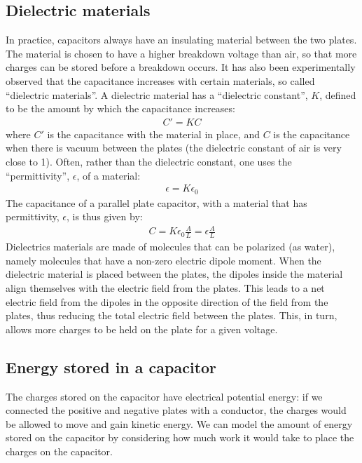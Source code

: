 \subsection{Dielectric materials}
In practice, capacitors always have an insulating material between the two plates. The material is chosen to have a higher breakdown voltage than air, so that more charges can be stored before a breakdown occurs. It has also been experimentally observed that the capacitance increases with certain materials, so called ``dielectric materials''. A dielectric material has a ``dielectric constant'', $K$, defined to be the amount by which the capacitance increases:
\begin{align*}
C'=KC
\end{align*}
where $C'$ is the capacitance with the material in place, and $C$ is the capacitance when there is vacuum between the plates (the dielectric constant of air is very close to 1). Often, rather than the dielectric constant, one uses the ``permittivity'', $\epsilon$, of a material:
\begin{align*}
\epsilon=K\epsilon_0
\end{align*}
The capacitance of a parallel plate capacitor, with a material that has permittivity, $\epsilon$, is thus given by:
\begin{align*}
C=K\epsilon_0\frac{A}{L}=\epsilon\frac{A}{L}
\end{align*}
Dielectrics materials are made of molecules that can be polarized (as water), namely molecules that have a non-zero electric dipole moment. When the dielectric material is placed between the plates, the dipoles inside the material align themselves with the electric field from the plates. This leads to a net electric field from the dipoles in the opposite direction of the field from the plates, thus reducing the total electric field between the plates. This, in turn, allows more charges to be held on the plate for a given voltage.

\subsection{Energy stored in a capacitor}
The charges stored on the capacitor have electrical potential energy: if we connected the positive and negative plates with a conductor, the charges would be allowed to move and gain kinetic energy. We can model the amount of energy stored on the capacitor by considering how much work it would take to place the charges on the capacitor.


